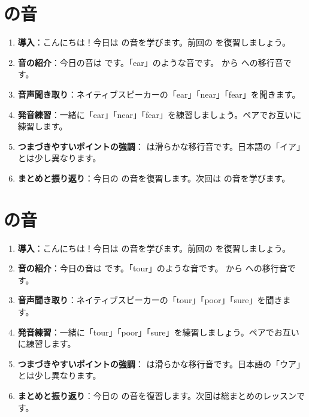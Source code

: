 \documentclass[book,jafontscale=0.9247]{jlreq}
\begin{document}
\section{ の音}
\begin{enumerate}
    \item \textbf{導入}：こんにちは！今日は  の音を学びます。前回の  を復習しましょう。
    \item \textbf{音の紹介}：今日の音は  です。「ear」のような音です。  から \textipa{/\textschwa /} への移行音です。
    \item \textbf{音声聞き取り}：ネイティブスピーカーの「ear」「near」「fear」を聞きます。
    \item \textbf{発音練習}：一緒に「ear」「near」「fear」を練習しましょう。ペアでお互いに練習します。
    \item \textbf{つまづきやすいポイントの強調}：  は滑らかな移行音です。日本語の「イア」とは少し異なります。
    \item \textbf{まとめと振り返り}：今日の  の音を復習します。次回は  の音を学びます。
\end{enumerate}

\section{ の音}
\begin{enumerate}
    \item \textbf{導入}：こんにちは！今日は  の音を学びます。前回の  を復習しましょう。
    \item \textbf{音の紹介}：今日の音は  です。「tour」のような音です。  から  への移行音です。
    \item \textbf{音声聞き取り}：ネイティブスピーカーの「tour」「poor」「sure」を聞きます。
    \item \textbf{発音練習}：一緒に「tour」「poor」「sure」を練習しましょう。ペアでお互いに練習します。
    \item \textbf{つまづきやすいポイントの強調}：  は滑らかな移行音です。日本語の「ウア」とは少し異なります。
    \item \textbf{まとめと振り返り}：今日の  の音を復習します。次回は総まとめのレッスンです。
\end{enumerate}
\end{document}
